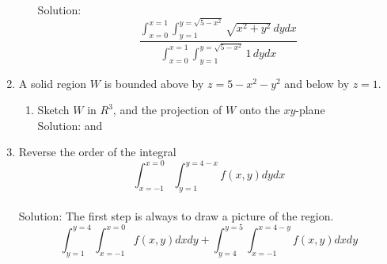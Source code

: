 \documentclass[11pt]{article}
\begin{document}
\begin{enumerate}
\begin{enumerate}
        Solution: \[\frac{\int_{x=0}^{x=1} \int_{y=1}^{y=\sqrt{5-x^2}} \sqrt{x^2+y^2} \, dy dx}{\int_{x=0}^{x=1} \int_{y=1}^{y=\sqrt{5-x^2}} 1 \, dy dx}\]
  \end{enumerate}
  \item A solid region $W$ is bounded above by $z=5-x^2-y^2$ and below by $z=1$.
    \begin{enumerate}
      \item Sketch $W$ in $R^3$, and the projection of $W$ onto the $xy$-plane  \\
        Solution: 
        and
    \end{enumerate}
  \item Reverse the order of the integral
    \[\int_{x=-1}^{x=0} \int_{y=1}^{y=4-x} f(x,y) dy dx\]\\
    Solution:
    The first step is always to draw a picture of the region.
    \[\int_{y=1}^{y=4} \int_{x=-1}^{x=0} f(x,y) dx dy + \int_{y=4}^{y=5} \int_{x=-1}^{x=4-y} f(x,y) dx dy\]
\end{enumerate}
\end{document}
